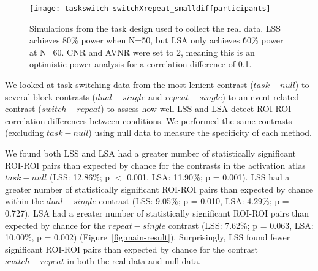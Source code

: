 \documentclass[phd,figures,tables,ackpage,abstractpage,publicabstractpage]{uithesis}
\begin{document}
\begin{figure}[H]
  \texttt{[image: taskswitch-switchXrepeat\_smalldiffparticipants]}
  \caption[Simulation power analysis using real task design]{
    Simulations from the task design used to collect the real data.
    LSS achieves 80\% power when N=50, but LSA only achieves \~60\% power at N=60.
    CNR and AVNR were set to 2, meaning this is an optimistic power analysis
    for a correlation difference of 0.1.
  }
  \label{fig:taskswitch-simulation}
\end{figure}

We looked at task switching data from the most lenient
contrast ($task - null$) to several block contrasts ($dual - single$ and $repeat - single$)
to an event-related contrast ($switch - repeat$)
to assess how well LSS and LSA detect ROI-ROI correlation differences between conditions.
We performed the same contrasts (excluding $task - null$)
using null data to measure the specificity of each method.

We found both LSS and LSA had a greater number of statistically significant ROI-ROI pairs than expected by chance
for the contrasts in the activation atlas $task - null$ (LSS: 12.86\%; p $<$ 0.001, LSA: 11.90\%; p = 0.001).
LSS had a greater number of statistically significant ROI-ROI pairs than expected by chance within the 
$dual - single$ contrast (LSS: 9.05\%; p = 0.010, LSA: 4.29\%; p = 0.727).
LSA had a greater number of statistically significant ROI-ROI pairs than expected by chance for the
$repeat - single$ contrast (LSS: 7.62\%; p = 0.063, LSA: 10.00\%, p = 0.002) (Figure~\ref{fig:main-result}).
Surprisingly, LSS found fewer significant ROI-ROI pairs than expected by chance
for the contrast $switch - repeat$ in both the real data and null data. 
\end{document}
